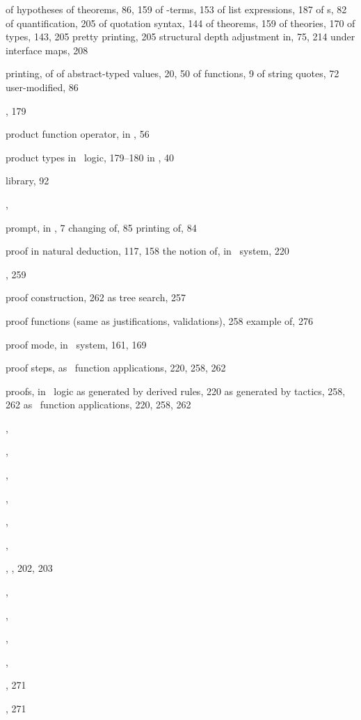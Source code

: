 \begin{theindex}
    \subitem of hypotheses of theorems, 86, 159
    \subitem of -terms, 153
    \subitem of list expressions, 187
    \subitem of s, 82
    \subitem of quantification, 205
    \subitem of quotation syntax, 144
    \subitem of theorems, 159
    \subitem of theories, 170
    \subitem of types, 143, 205
    \subitem pretty printing, 205
    \subitem structural depth adjustment in, 75, 214
    \subitem under interface maps, 208
  \item printing, of \ML
    \subitem of abstract-typed values, 20, 50
    \subitem of functions, 9
    \subitem of string quotes, 72
    \subitem user-modified, 86
  \item {}, 179
  \item product function operator, in \ML, 56
  \item product types
    \subitem in \HOL\ logic, 179--180
    \subitem in \ML, 40
  \item {} library, 92
  \item {}, 
  \item prompt, in \ML, 7
    \subitem changing of, 85
    \subitem printing of, 84
  \item proof
    \subitem in natural deduction, 117, 158
    \subitem the notion of, in \HOL\ system, 220
  \item {}, 259
  \item proof construction, 262
    \subitem as tree search, 257
  \item proof functions (same as justifications, validations), 258
    \subitem {} example of, 276
  \item proof mode, in \HOL\ system, 161, 169
  \item proof steps, as \ML\ function applications, 220, 258, 262
  \item proofs, in \HOL\ logic
    \subitem as generated by derived rules, 220
    \subitem as generated by tactics, 258, 262
    \subitem as \ML\ function applications, 220, 258, 262
  \item {}, 
  \item {}, 
  \item {}, 
  \item {}, 
  \item {}, 
  \item {}, 
  \item {}, , 202, 203
  \item {}, 
  \item {}, 
  \item {}, 
  \item {}, 
  \item {}, 271
  \item {}, 271


\end{theindex}
